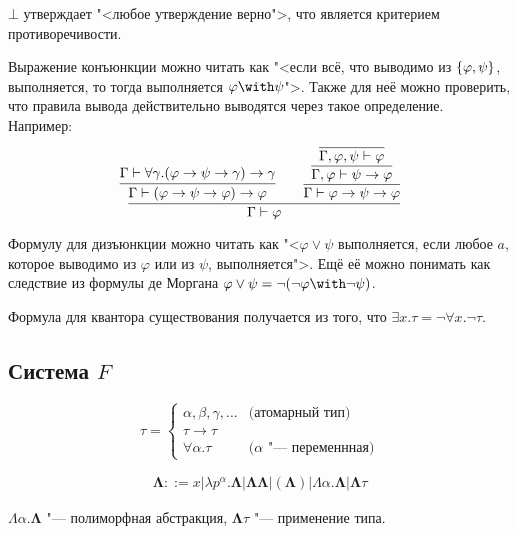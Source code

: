 $\bot$ утверждает "<любое утверждение верно">, что является критерием противоречивости.

Выражение конъюнкции можно читать как "<если всё, что выводимо из $\left\{\varphi,\psi\right\}$, выполняется,
то тогда выполняется $\varphi\with\psi$">.
Также для неё можно проверить, что правила вывода действительно выводятся через такое определение. Например:
\[
    \infer{\Gamma \vdash \varphi}
    {
        \infer{\Gamma \vdash (\varphi\rightarrow\psi\rightarrow\varphi)\rightarrow\varphi}
            {\Gamma \vdash \forall \gamma.(\varphi\rightarrow\psi\rightarrow\gamma)\rightarrow\gamma}
        &&
        \infer{\Gamma\vdash\varphi\rightarrow\psi\rightarrow\varphi}
        {\infer{\Gamma,\varphi\vdash\psi\rightarrow\varphi}
        {\infer{\Gamma,\varphi,\psi\vdash\varphi}
        {}}}
    }
\]

Формулу для дизъюнкции можно читать как "<$\varphi \vee \psi$ выполняется,
если любое $a$, которое выводимо из $\varphi$ или из $\psi$, выполняется">.
Ещё её можно понимать как следствие из формулы де Моргана $\varphi\vee\psi=\neg(\neg\varphi\with\neg\psi)$.

Формула для квантора существования получается из того, что $\exists x . \tau = \neg \forall x . \neg \tau$.

\subsection{\texorpdfstring{Система $F$}{System F}}
\begin{definition}
\[
    \tau =
    \begin{cases}
        \alpha, \beta, \gamma, \ldots & \text{(атомарный тип)} \\
        \tau \rightarrow \tau \\
        \forall \alpha . \tau & \text{($\alpha$ "--- переменнная)}
    \end{cases}
\]
\end{definition}

\begin{definition}
    \begin{bnf}
        \begin{gather*}
            \mathbf\Lambda ::= x | \lambda p^\alpha . \mathbf\Lambda | \mathbf\Lambda \mathbf\Lambda | (\mathbf\Lambda)
            | \Lambda \alpha . \mathbf\Lambda | \mathbf\Lambda \tau
        \end{gather*}
    \end{bnf}
    $\Lambda \alpha . \mathbf\Lambda$ "--- полиморфная абстракция, $\mathbf\Lambda \tau$ "--- применение типа.
\end{definition}

